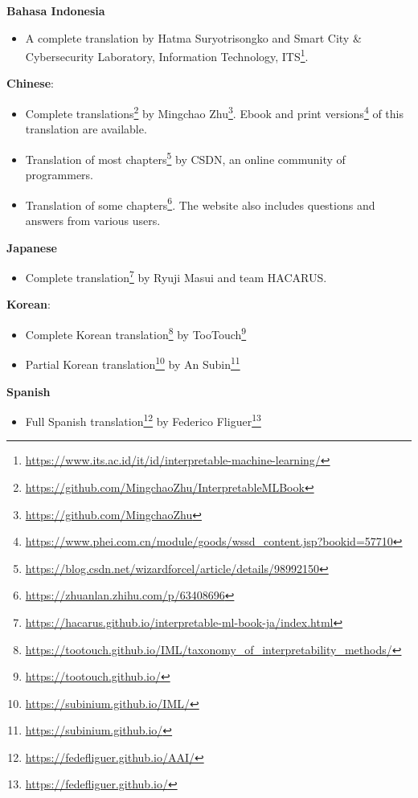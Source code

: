 \documentclass[12pt,]{krantz}
\providecommand{\tightlist}{%
  \setlength{\itemsep}{0pt}\setlength{\parskip}{0pt}}
\renewcommand{\href}[2]{#2\footnote{\url{#1}}}
\begin{document}
\textbf{Bahasa Indonesia}

\begin{itemize}
\tightlist
\item
  \href{https://www.its.ac.id/it/id/interpretable-machine-learning/}{A
  complete translation by Hatma Suryotrisongko and Smart City \&
  Cybersecurity Laboratory, Information Technology, ITS}.
\end{itemize}

\textbf{Chinese}:

\begin{itemize}
\tightlist
\item
  \href{https://github.com/MingchaoZhu/InterpretableMLBook}{Complete
  translations} by \href{https://github.com/MingchaoZhu}{Mingchao Zhu}.
  \href{https://www.phei.com.cn/module/goods/wssd_content.jsp?bookid=57710}{Ebook
  and print versions} of this translation are available.
\item
  \href{https://blog.csdn.net/wizardforcel/article/details/98992150}{Translation
  of most chapters} by CSDN, an online community of programmers.
\item
  \href{https://zhuanlan.zhihu.com/p/63408696}{Translation of some
  chapters}. The website also includes questions and answers from
  various users.
\end{itemize}

\textbf{Japanese}

\begin{itemize}
\tightlist
\item
  \href{https://hacarus.github.io/interpretable-ml-book-ja/index.html}{Complete
  translation} by Ryuji Masui and team HACARUS.
\end{itemize}

\textbf{Korean}:

\begin{itemize}
\item
  \href{https://tootouch.github.io/IML/taxonomy_of_interpretability_methods/}{Complete
  Korean translation} by \href{https://tootouch.github.io/}{TooTouch}
\item
  \href{https://subinium.github.io/IML/}{Partial Korean translation} by
  \href{https://subinium.github.io/}{An Subin}
\end{itemize}

\textbf{Spanish}

\begin{itemize}
\tightlist
\item
  \href{https://fedefliguer.github.io/AAI/}{Full Spanish translation} by
  \href{https://fedefliguer.github.io/}{Federico Fliguer}
\end{itemize}
\end{document}
